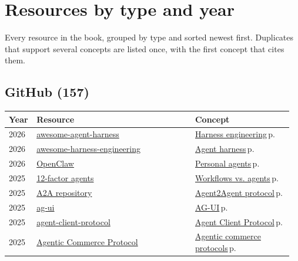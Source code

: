 \documentclass[10pt,a4paper,openany]{report}
\begin{document}
\chapter{Resources by type and year}
Every resource in the book, grouped by type and sorted newest first. Duplicates that support several concepts are listed once, with the first concept that cites them.

\section{GitHub (157)}
{\small\begin{longtable}{@{}p{0.07\linewidth}>{\raggedright}p{0.55\linewidth}>{\raggedright\arraybackslash}p{0.34\linewidth}@{}}
\textbf{\sffamily Year} & \textbf{\sffamily Resource} & \textbf{\sffamily Concept}\\ \hline\endhead
2026 & \href{https://github.com/AutoJunjie/awesome-agent-harness}{awesome-agent-harness} & \hyperref[c:agents-1]{Harness engineering}\,{\color{muted}\scriptsize p.\,\pageref{c:agents-1}}\\
2026 & \href{https://github.com/ai-boost/awesome-harness-engineering}{awesome-harness-engineering} & \hyperref[c:agents-0]{Agent harness}\,{\color{muted}\scriptsize p.\,\pageref{c:agents-0}}\\
2026 & \href{https://github.com/openclaw/openclaw}{OpenClaw} & \hyperref[c:agents-10]{Personal agents}\,{\color{muted}\scriptsize p.\,\pageref{c:agents-10}}\\
2025 & \href{https://github.com/humanlayer/12-factor-agents}{12-factor agents} & \hyperref[c:agents-4]{Workflows vs. agents}\,{\color{muted}\scriptsize p.\,\pageref{c:agents-4}}\\
2025 & \href{https://github.com/a2aproject/A2A}{A2A repository} & \hyperref[c:protocols-3]{Agent2Agent protocol}\,{\color{muted}\scriptsize p.\,\pageref{c:protocols-3}}\\
2025 & \href{https://github.com/ag-ui-protocol/ag-ui}{ag-ui} & \hyperref[c:protocols-8]{AG-UI}\,{\color{muted}\scriptsize p.\,\pageref{c:protocols-8}}\\
2025 & \href{https://github.com/zed-industries/agent-client-protocol}{agent-client-protocol} & \hyperref[c:protocols-7]{Agent Client Protocol}\,{\color{muted}\scriptsize p.\,\pageref{c:protocols-7}}\\
2025 & \href{https://github.com/agentic-commerce-protocol/agentic-commerce-protocol}{Agentic Commerce Protocol} & \hyperref[c:protocols-9]{Agentic commerce protocols}\,{\color{muted}\scriptsize p.\,\pageref{c:protocols-9}}\\

\end{longtable}}
\end{document}
